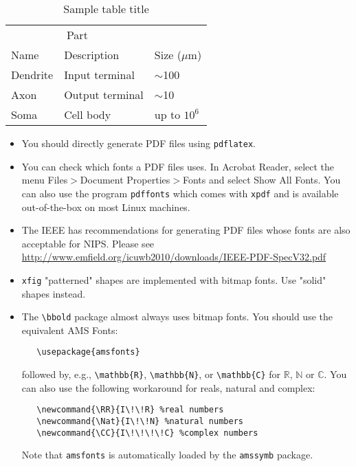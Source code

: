 \documentclass{article}
\begin{document}
\begin{table}[t]
  \caption{Sample table title}
  \label{sample-table}
  \centering
  \begin{tabular}{lll}
    \toprule
    \multicolumn{2}{c}{Part}                   \\
    \cmidrule{1-2}
    Name     & Description     & Size ($\mu$m) \\
    \midrule
    Dendrite & Input terminal  & $\sim$100     \\
    Axon     & Output terminal & $\sim$10      \\
    Soma     & Cell body       & up to $10^6$  \\
    \bottomrule
  \end{tabular}
\end{table}



\begin{itemize}

\item You should directly generate PDF files using \verb+pdflatex+.

\item You can check which fonts a PDF files uses.  In Acrobat Reader,
  select the menu Files$>$Document Properties$>$Fonts and select Show
  All Fonts. You can also use the program \verb+pdffonts+ which comes
  with \verb+xpdf+ and is available out-of-the-box on most Linux
  machines.

\item The IEEE has recommendations for generating PDF files whose
  fonts are also acceptable for NIPS. Please see
  \url{http://www.emfield.org/icuwb2010/downloads/IEEE-PDF-SpecV32.pdf}

\item \verb+xfig+ "patterned" shapes are implemented with bitmap
  fonts.  Use "solid" shapes instead.

\item The \verb+\bbold+ package almost always uses bitmap fonts.  You
  should use the equivalent AMS Fonts:
\begin{verbatim}
   \usepackage{amsfonts}
\end{verbatim}
followed by, e.g., \verb+\mathbb{R}+, \verb+\mathbb{N}+, or
\verb+\mathbb{C}+ for $\mathbb{R}$, $\mathbb{N}$ or $\mathbb{C}$.  You
can also use the following workaround for reals, natural and complex:
\begin{verbatim}
   \newcommand{\RR}{I\!\!R} %real numbers
   \newcommand{\Nat}{I\!\!N} %natural numbers
   \newcommand{\CC}{I\!\!\!\!C} %complex numbers
\end{verbatim}
Note that \verb+amsfonts+ is automatically loaded by the
\verb+amssymb+ package.

\end{itemize}
\end{document}
